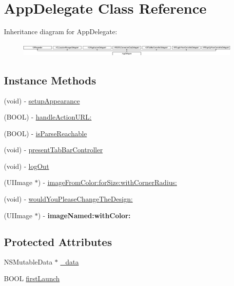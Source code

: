 \hypertarget{interface_app_delegate}{}\section{App\+Delegate Class Reference}
\label{interface_app_delegate}
Inheritance diagram for App\+Delegate\+:\begin{figure}[H]
\begin{center}
\leavevmode
\includegraphics[height=0.714286cm]{interface_app_delegate}
\end{center}
\end{figure}
\subsection*{Instance Methods}
\begin{DoxyCompactItemize}
\item 
(void) -\/ \hyperlink{interface_app_delegate_a0f02167a81f470e6880ff4d013858185}{setup\+Appearance}
\item 
(B\+O\+O\+L) -\/ \hyperlink{interface_app_delegate_addfe396cf66b8027d5f139899e83aa39}{handle\+Action\+U\+R\+L\+:}
\item 
(B\+O\+O\+L) -\/ \hyperlink{interface_app_delegate_aae653124268ab1a49e77ebb5cc351622}{is\+Parse\+Reachable}
\item 
(void) -\/ \hyperlink{interface_app_delegate_a0774d64f571fc3d6e3550f43bd368d84}{present\+Tab\+Bar\+Controller}
\item 
(void) -\/ \hyperlink{interface_app_delegate_a6153d1fcc9687bb08a22c466e54ccd02}{log\+Out}
\item 
(U\+I\+Image $\ast$) -\/ \hyperlink{interface_app_delegate_a25527300e92de3209b82cf90db47b4d7}{image\+From\+Color\+:for\+Size\+:with\+Corner\+Radius\+:}
\item 
(void) -\/ \hyperlink{interface_app_delegate_ad29898ea3741330f380051e00b18a68f}{would\+You\+Please\+Change\+The\+Design\+:}
\item 
\hypertarget{interface_app_delegate_af596e992ce5310e8ad0c126f22476e8d}{}(U\+I\+Image $\ast$) -\/ {\bfseries image\+Named\+:with\+Color\+:}\label{interface_app_delegate_af596e992ce5310e8ad0c126f22476e8d}

\end{DoxyCompactItemize}
\subsection*{Protected Attributes}
\begin{DoxyCompactItemize}
\item 
N\+S\+Mutable\+Data $\ast$ \hyperlink{interface_app_delegate_ae3f9e31861537f349282d429a83a5f7a}{\+\_\+data}
\item 
B\+O\+O\+L \hyperlink{interface_app_delegate_ab5357e16bdef7cd69162d349a438addd}{first\+Launch}
\end{DoxyCompactItemize}
